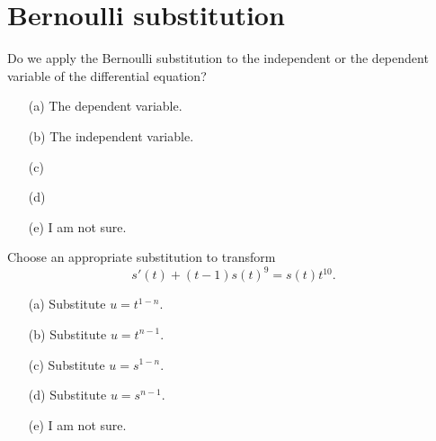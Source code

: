 \documentclass[14pt]{beamer}
\begin{document}
\section{Bernoulli substitution}

\begin{frame}[t]
  Do we apply the Bernoulli substitution to the independent or the dependent variable of the differential equation?

  \begin{itemize} \setlength\itemsep{1ex}
    \item[(a)] The dependent variable.
    \item[(b)] The independent variable.
    \item[(c)] 
    \item[(d)] 
    \item[(e)] I am not sure.
  \end{itemize} 
\end{frame}

\begin{frame}[t]
  Choose an appropriate substitution to transform
  \[
    s'(t) + (t-1)s(t)^{9} = s(t) t^{10}.
  \]

  \begin{itemize} \setlength\itemsep{1ex}
    \item[(a)] Substitute \(u = t^{1-n}\).
    \item[(b)] Substitute \(u = t^{n-1}\).
    \item[(c)] Substitute \(u = s^{1-n}\).
    \item[(d)] Substitute \(u = s^{n-1}\).
    \item[(e)] I am not sure.
  \end{itemize} 
\end{frame}
\end{document}
